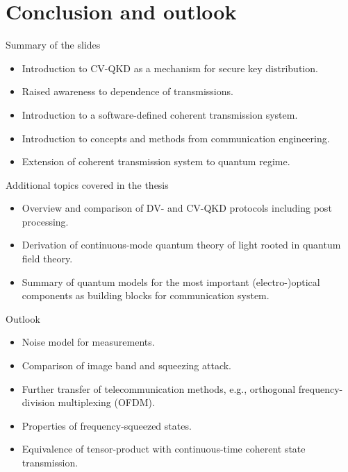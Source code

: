 \documentclass[aspectratio=169,usenames,dvipsnames]{beamer}
\begin{document}
	\section{Conclusion and outlook}
	
	\begin{frame}{Summary of the slides}
		\begin{itemize}
			\item Introduction to CV-QKD as a mechanism for secure key distribution.
			\item Raised awareness to dependence of transmissions.
			\item Introduction to a software-defined coherent transmission system.
			\item Introduction to concepts and methods from communication engineering.
			\item Extension of coherent transmission system to quantum regime.
		\end{itemize}
	\end{frame}
	
	\begin{frame}{Additional topics covered in the thesis}
		\begin{itemize}
			\item Overview and comparison of DV- and CV-QKD protocols including post processing.
			\item Derivation of continuous-mode quantum theory of light rooted in quantum field theory.
			\item Summary of quantum models for the most important (electro-)optical components as building blocks for communication system.
		\end{itemize}		
	\end{frame}
	
	\begin{frame}{Outlook}
		\begin{itemize}
			\item Noise model for measurements.
			\item Comparison of image band and squeezing attack.
			\item Further transfer of telecommunication methods, e.g., orthogonal frequency-division multiplexing (OFDM).
			\item Properties of frequency-squeezed states.
			\item Equivalence of tensor-product with continuous-time coherent state transmission.
		\end{itemize}
	\end{frame}
\end{document}
